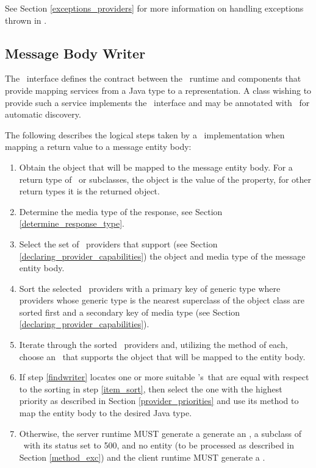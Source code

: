See Section \ref{exceptions_providers} for more information on handling exceptions thrown in \MsgRead{}.

\subsection{Message Body Writer}
\label{message_body_writer}

The \MsgWrite\ interface defines the contract between the \jaxrs\ runtime and components that provide mapping services from a Java type to a representation. A class wishing to provide such a service implements the \MsgWrite\ interface and may be annotated with \Provider\ for automatic discovery.

The following describes the logical steps taken by a \jaxrs\ implementation when mapping a return value to a message entity body:

\begin{enumerate}
\item Obtain the object that will be mapped to the message entity body. For a return type of \Response\ or subclasses, the object is the value of the  property, for other return types it is the returned object.
\item Determine the media type of the response, see Section \ref{determine_response_type}.
\item Select the set of \MsgWrite\ providers that support (see Section \ref{declaring_provider_capabilities}) the object and media type of the message entity body.
\item\label{item_sort} Sort the selected \MsgWrite\ providers with a primary key of generic type where providers whose generic type is the nearest superclass of the object class are sorted first and a secondary key of media type (see Section \ref{declaring_provider_capabilities}).
\item\label{findwriter} Iterate through the sorted \MsgWrite\ providers and, utilizing the  method of each, choose an \MsgWrite\ that supports the object that will be mapped to the entity body.
\item If step \ref{findwriter} locates one or more suitable \MsgWrite's\ that are equal with respect to the sorting in step \ref{item_sort}, then select the one with the highest priority as described in Section \ref{provider_priorities} and use its  method to map the entity body to the desired Java type.
\item Otherwise, the server runtime MUST generate a generate an , a subclass of \WebAppExc\ with its status set to 500, and no entity (to be processed as described in Section \ref{method_exc}) and the client runtime MUST generate a .

\end{enumerate}

